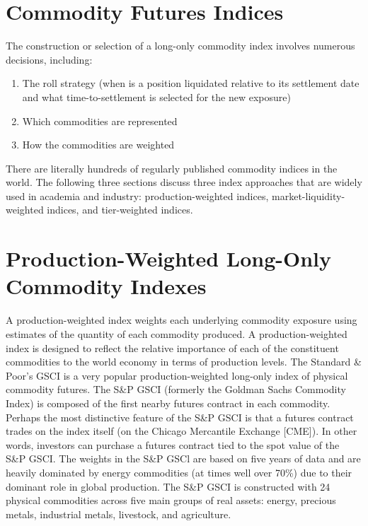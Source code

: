 \documentclass[11pt]{article}
\begin{document}
\section*{Commodity Futures Indices}
The construction or selection of a long-only commodity index involves numerous decisions, including:

\begin{enumerate}
  \item The roll strategy (when is a position liquidated relative to its settlement date and what time-to-settlement is selected for the new exposure)

  \item Which commodities are represented

  \item How the commodities are weighted

\end{enumerate}

There are literally hundreds of regularly published commodity indices in the world. The following three sections discuss three index approaches that are widely used in academia and industry: production-weighted indices, market-liquidity-weighted indices, and tier-weighted indices.

\section*{Production-Weighted Long-Only Commodity Indexes}
A production-weighted index weights each underlying commodity exposure using estimates of the quantity of each commodity produced. A production-weighted index is designed to reflect the relative importance of each of the constituent commodities to the world economy in terms of production levels. The Standard \& Poor's GSCI is a very popular production-weighted long-only index of physical commodity futures. The S\&P GSCI (formerly the Goldman Sachs Commodity Index) is composed of the first nearby futures contract in each commodity. Perhaps the most distinctive feature of the S\&P GSCI is that a futures contract trades on the index itself (on the Chicago Mercantile Exchange [CME]). In other words, investors can purchase a futures contract tied to the spot value of the S\&P GSCI. The weights in the S\&P GSCl are based on five years of data and are heavily dominated by energy commodities (at times well over 70\%) due to their dominant role in global production. The S\&P GSCI is constructed with 24 physical commodities across five main groups of real assets: energy, precious metals, industrial metals, livestock, and agriculture.
\end{document}
